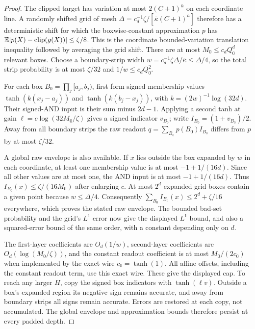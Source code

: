\begin{proof}
The clipped target has variation at most $2(C+1)^h$ on each coordinate
line.  A randomly shifted grid of mesh
$\Delta=c_d^{-1}\zeta/[\bar\kappa(C+1)^h]$ therefore has a deterministic
shift for which the boxwise-constant approximation $p$ has
$\mathbb E|p(X)-\operatorname{clip}(g(X))|\le\zeta/8$.
This is the coordinate bounded-variation translation inequality followed
by averaging the grid shift.  There are at most
$M_0\le c_dQ_0^d$ relevant boxes.  Choose a boundary-strip width
$w=c_d^{-1}\zeta\Delta/\bar\kappa\le\Delta/4$, so the total strip
probability is at most $\zeta/32$ and $1/w\le c_dQ_0^2$.

For each box $B_0=\prod_j[a_j,b_j)$, first form signed membership values
$\tanh(k(x_j-a_j))$ and $\tanh(k(b_j-x_j))$, with
$k=(2w)^{-1}\log(32d)$.  Their signed-AND input is their sum minus
$2d-1$.  Applying a second tanh at gain
$\ell=c\log(32M_0/\zeta)$ gives a signed indicator $v_{B_0}$;
write $I_{B_0}=(1+v_{B_0})/2$.  Away from all boundary strips the raw
readout $q=\sum_{B_0}p(B_0)I_{B_0}$ differs from $p$ by at most
$\zeta/32$.

A global raw envelope is also available.  If $x$ lies outside the box
expanded by $w$ in each coordinate, at least one membership value is
at most $-1+1/(16d)$.  Since all other values are at most one, the AND
input is at most $-1+1/(16d)$.  Thus
$I_{B_0}(x)\le\zeta/(16M_0)$ after enlarging $c$.  At most $2^d$
expanded grid boxes contain a given point because $w\le\Delta/4$.
Consequently $\sum_{B_0}I_{B_0}(x)\le2^d+\zeta/16$ everywhere, which
proves the stated raw envelope.  The bounded bad-set probability and
the grid's $L^1$ error now give the displayed $L^1$ bound, and also a
squared-error bound of the same order, with a constant
depending only on $d$.

The first-layer coefficients are $O_d(1/w)$, second-layer coefficients
are $O_d(\log(M_0/\zeta))$, and the constant readout coefficient is at
most $M_0/(2c_0)$ when implemented by the exact wire $c_0=\tanh(1)$.
All affine offsets, including the constant readout term, use this
exact wire. These give the displayed cap. To reach any larger $H$, copy the signed
box indicators with $\tanh(\ell v)$.  Outside a box's expanded region
its negative sign remains accurate, and away from boundary strips all
signs remain accurate.  Errors are restored at each copy, not accumulated.
The global envelope and approximation bounds therefore persist at every
padded depth.
\end{proof}

